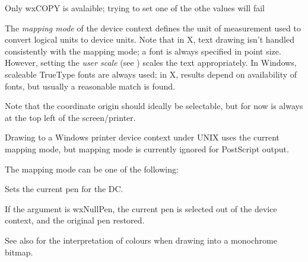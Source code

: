 

Only wxCOPY is avalaible; trying to set one of the othe values will fail

\label{wxdcsetmapmode}


The {\it mapping mode} of the device context defines the unit of
measurement used to convert logical units to device units. Note that
in X, text drawing isn't handled consistently with the mapping mode; a
font is always specified in point size. However, setting the {\it
user scale} (see ) scales the text appropriately. In
Windows, scaleable TrueType fonts are always used; in X, results depend
on availability of fonts, but usually a reasonable match is found.

Note that the coordinate origin should ideally be selectable, but for
now is always at the top left of the screen/printer.

Drawing to a Windows printer device context under UNIX
uses the current mapping mode, but mapping mode is currently ignored for
PostScript output.

The mapping mode can be one of the following:

\begin{twocollist}\itemsep=0pt
\end{twocollist}

\label{wxdcsetpen}


Sets the current pen for the DC.

If the argument is wxNullPen, the current pen is selected out of the device
context, and the original pen restored.

See also  for the interpretation of colours
when drawing into a monochrome bitmap.

\label{wxdcsettextbackground}


